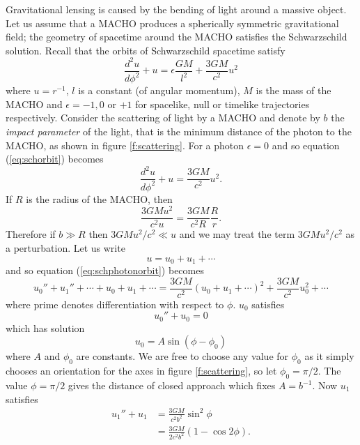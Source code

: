 Gravitational lensing is caused by the bending of light around a massive
object. Let us assume that a MACHO produces a spherically symmetric
gravitational field; the geometry of spacetime around the MACHO satisfies the
Schwarzschild solution. Recall that the orbits of Schwarzschild spacetime
satisfy
\begin{equation}
\frac{d^2 u}{d\phi^2} + u = \epsilon \frac{GM}{l^2} + \frac{3GM}{c^2}u^2
\label{eq:schorbit}
\end{equation}
where $u = r^{-1}$, $l$ is a constant (of angular momentum), $M$ is the mass
of the MACHO and $\epsilon = -1,0$ or $+1$ for spacelike, null or timelike
trajectories respectively. Consider the scattering of light by a MACHO and
denote by $b$ the \emph{impact parameter} of the light, that is the minimum
distance of the photon to the MACHO, as shown in figure \ref{f:scattering}.
For a photon $\epsilon = 0$ and so equation (\ref{eq:schorbit}) becomes
\begin{equation}
\frac{d^2 u}{d\phi^2} + u =  \frac{3GM}{c^2}u^2.
\label{eq:schphotonorbit}
\end{equation}
If $R$ is the radius of the MACHO, then
\begin{equation}
\frac{3GMu^2}{c^2u} = \frac{3GM}{c^2R} \frac{R}{r}.
\end{equation}
Therefore if $b \gg R$ then $3GMu^2/c^2 \ll u$ and we may treat the term
$3GMu^2/c^2$ as a perturbation. Let us write
\begin{equation}
u = u_0 + u_1 + \cdots
\end{equation}
and so equation (\ref{eq:schphotonorbit}) becomes
\begin{equation}
u_0'' + u_1'' + \cdots + u_0 + u_1 + \cdots = \frac{3GM}{c^2}\left(u_0 + u_1 +
\cdots\right)^2 + \frac{3GM}{c^2}u_0^2 + \cdots
\end{equation}
where prime denotes differentiation with respect to $\phi$. $u_0$ satisfies
\begin{equation}
u_0'' + u_0 = 0
\end{equation}
which has solution
\begin{equation}
u_0 = A \sin \left(\phi - \phi_0\right)
\end{equation}
where $A$ and $\phi_0$ are constants. We are free to choose any value for
$\phi_0$ as it simply chooses an orientation for the axes in figure
\ref{f:scattering}, so let $\phi_0 = \pi /2$. The value $\phi = \pi / 2$
gives the distance of closed approach which fixes $A = b^{-1}$. Now $u_1$
satisfies
\begin{equation}
\begin{split}
u_1'' + u_1 &= \frac{3GM}{c^2b^2} \sin^2 \phi \\
&= \frac{3GM}{2c^2b^2}\left(1 - \cos 2\phi\right).
\label{eq:u1eq}
\end{split}
\end{equation}
